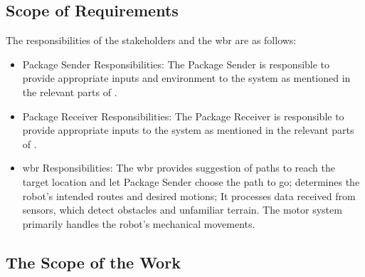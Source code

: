 \documentclass[12pt]{article}
\begin{document}
\subsection{Scope of Requirements}
The responsibilities of the stakeholders and the \acrshort{wbr} are as follows:
\begin{itemize}
    \item Package Sender Responsibilities: The Package Sender is responsible to provide appropriate inputs and environment to the system as mentioned in the relevant parts of . %
    \item Package Receiver Responsibilities: The Package Receiver is responsible to provide appropriate inputs to the system as mentioned in the relevant parts of . %
    \item \acrshort{wbr} Responsibilities: The \acrshort{wbr} provides suggestion of paths to reach the target location and let Package Sender choose the path to go; determines the robot's intended routes and desired motions; It processes data received from sensors, which detect obstacles and unfamiliar terrain. The motor system primarily handles the robot's mechanical movements.
\end{itemize}

\subsection{The Scope of the Work}
\end{document}
